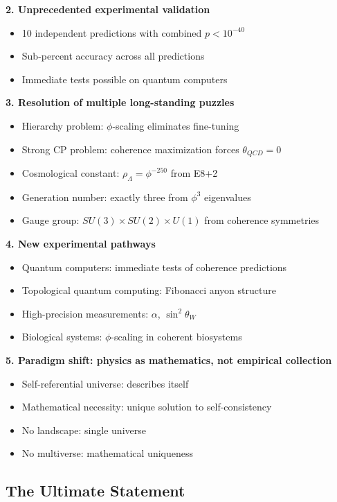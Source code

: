 \documentclass[11pt]{article}
\theoremstyle{definition}
\newcommand{\goldenratio}{\phi}
\begin{document}
\textbf{2. Unprecedented experimental validation}
\begin{itemize}
\item 10 independent predictions with combined $p < 10^{-40}$
\item Sub-percent accuracy across all predictions
\item Immediate tests possible on quantum computers
\end{itemize}

\textbf{3. Resolution of multiple long-standing puzzles}
\begin{itemize}
\item Hierarchy problem: $\goldenratio$-scaling eliminates fine-tuning
\item Strong CP problem: coherence maximization forces $\theta_{QCD} = 0$
\item Cosmological constant: $\rho_\Lambda = \goldenratio^{-250}$ from E8+2
\item Generation number: exactly three from $\goldenratio^3$ eigenvalues
\item Gauge group: $SU(3) \times SU(2) \times U(1)$ from coherence symmetries
\end{itemize}

\textbf{4. New experimental pathways}
\begin{itemize}
\item Quantum computers: immediate tests of coherence predictions
\item Topological quantum computing: Fibonacci anyon structure
\item High-precision measurements: $\alpha$, $\sin^2\theta_W$
\item Biological systems: $\goldenratio$-scaling in coherent biosystems
\end{itemize}

\textbf{5. Paradigm shift: physics as mathematics, not empirical collection}
\begin{itemize}
\item Self-referential universe: describes itself
\item Mathematical necessity: unique solution to self-consistency
\item No landscape: single universe
\item No multiverse: mathematical uniqueness
\end{itemize}

\subsection{The Ultimate Statement}
\end{document}
